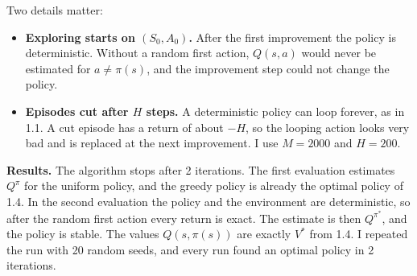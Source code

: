\documentclass[letterpaper, 11pt]{article}
\newcommand{\1}{\mathds{1}}	%
\theoremstyle{definition}
\begin{document}
Two details matter:
\begin{itemize}
  \item \textbf{Exploring starts on $(S_0, A_0)$.} After the first improvement the policy is deterministic. Without a random first action, $Q(s, a)$ would never be estimated for $a \neq \pi(s)$, and the improvement step could not change the policy.
  \item \textbf{Episodes cut after $H$ steps.} A deterministic policy can loop forever, as in 1.1. A cut episode has a return of about $-H$, so the looping action looks very bad and is replaced at the next improvement. I use $M = 2000$ and $H = 200$.
\end{itemize}

\textbf{Results.} The algorithm stops after 2 iterations. The first evaluation estimates $Q^\pi$ for the uniform policy, and the greedy policy is already the optimal policy of 1.4. In the second evaluation the policy and the environment are deterministic, so after the random first action every return is exact. The estimate is then $Q^{\pi^*}$, and the policy is stable. The values $Q(s, \pi(s))$ are exactly $V^*$ from 1.4. I repeated the run with 20 random seeds, and every run found an optimal policy in 2 iterations.
\end{document}
